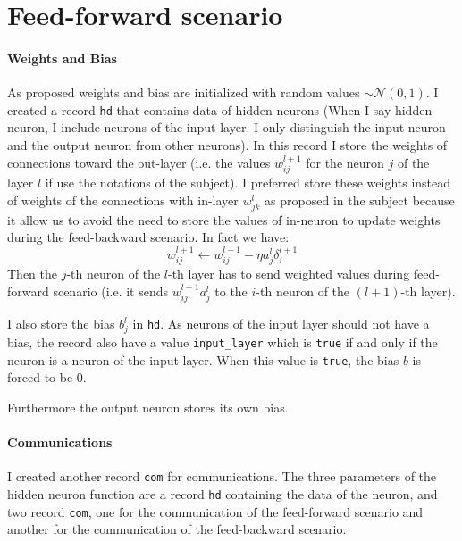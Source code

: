 \documentclass[12pt]{article}
\begin{document}
\section{Feed-forward scenario}

\paragraph{Weights and Bias}
As proposed weights and bias are initialized with random values $\sim \mathcal{N}(0, 1)$. I created a record \verb|hd| that contains data of hidden neurons (When I say hidden neuron, I include neurons of the input layer. I only distinguish the input neuron and the output neuron from other neurons). In this record I store the weights of connections toward the out-layer (i.e. the values $w_{ij}^{l+1}$ for the neuron $j$ of the layer $l$ if use the notations of the subject). I preferred store these weights instead of weights of the connections with in-layer $w_{jk}^l$ as proposed in the subject because it allow us to avoid the need to store the values of in-neuron to update weights during the feed-backward scenario. In fact we have:
$$ w_{ij}^{l+1} \gets w_{ij}^{l+1} - \eta a_j^l \delta_i^{l+1} $$
Then the $j$-th neuron of the $l$-th layer has to send weighted values during feed-forward scenario (i.e. it sends $w_{ij}^{l+1} a_j^l$ to the $i$-th neuron of the $(l+1)$-th layer).

I also store the bias $b_j^l$ in \verb|hd|. As neurons of the input layer should not have a bias, the record also have a value \verb|input_layer| which is \verb|true| if and only if the neuron is a neuron of the input layer. When this value is \verb|true|, the bias $b$ is forced to be 0.

Furthermore the output neuron stores its own bias.

\paragraph{Communications}
I created another record \verb|com| for communications. The three parameters of the hidden neuron function are a record \verb|hd| containing the data of the neuron, and two record \verb|com|, one for the communication of the feed-forward scenario and another for the communication of the feed-backward scenario.
\end{document}
